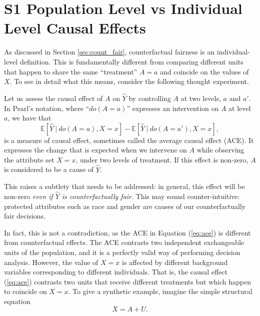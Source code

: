 

\section*{S1 Population Level vs Individual Level Causal Effects}
\label{sec:individual}

As discussed in Section \ref{sec:count_fair}, counterfactual fairness
is an individual-level definition. This is fundamentally different
from comparing different units that happen to share the same
“treatment” $A = a$ and coincide on the values of $X$. To see in
detail what this means, consider the following thought experiment.

Let us assess the causal effect of $A$ on $\hat Y$ by controlling
$A$ at two levels, $a$ and $a'$. In Pearl's notation, where ``$do(A = a)$''
expresses an intervention on $A$ at level $a$, we have that
\begin{equation}
\label{eq:ace}
\mathbb{E}[\hat Y\ |\ do(A = a), X = x] - \mathbb{E}[\hat Y\ |\ do(A = a'), X = x],
\end{equation}
is a measure of causal effect, sometimes called the average causal
effect (ACE). It expresses the change that is expected when we
intervene on $A$ while observing the attribute set $X = x$, under two
levels of treatment. If this effect is non-zero, $A$ is considered to
be a cause of $\hat Y$.

This raises a subtlety that needs to be addressed: in general, this
effect will be non-zero {\it even if $\hat Y$ is counterfactually
  fair}. This may sound counter-intuitive: protected attributes such
as race and gender are causes of our counterfactually fair decisions.

In fact, this is not a contradiction, as the ACE in Equation
(\ref{eq:ace}) is different from counterfactual effects. The ACE
contrasts two independent exchangeable units of the population, and it
is a perfectly valid way of performing decision analysis. However, the
value of $X = x$ is affected by different background variables
corresponding to different individuals. That is, the causal effect
(\ref{eq:ace}) contrasts two units that receive different treatments
but which happen to coincide on $X = x$. To give a synthetic example,
imagine the simple structural equation
\[
X = A + U.
\]

